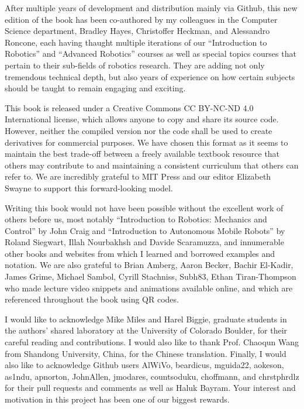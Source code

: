 \documentclass[paper=7in:9in,pagesize=pdftex,11pt,twoside,openright]{scrbook}
\begin{document}
After multiple years of development and distribution mainly via Github, this new edition of the book has been co-authored by my colleagues in the Computer Science department, Bradley Hayes, Christoffer Heckman, and Alessandro Roncone, each having thaught multiple iterations of our ``Introduction to Robotics'' and ``Advanced Robotics'' courses as well as special topics courses that pertain to their sub-fields of robotics research. They are adding not only tremendous technical depth, but also years of experience on how certain subjects should be taught to remain engaging and exciting.

This book is released under a Creative Commons CC BY-NC-ND 4.0 International license, which allows anyone to copy and share its source code. However, neither the compiled version nor the code shall be used to create derivatives for commercial purposes. We have chosen this format as it seems to maintain the best trade-off between a freely available textbook resource that others may contribute to and maintaining a consistent curriculum that others can refer to. We are incredibly grateful to MIT Press and our editor Elizabeth Swayne to support this forward-looking model.

Writing this book would not have been possible without the excellent work of others before us, most notably ``Introduction to Robotics: Mechanics and Control'' by John Craig and ``Introduction to Autonomous Mobile Robots'' by Roland Siegwart, Illah Nourbakhsh and Davide Scaramuzza, and innumerable other books and websites from which I learned and borrowed examples and notation. We are also grateful to Brian Amberg, Aaron Becker, Bachir El-Kadir,  James Grime, Michael Sambol, Cyrill Stachniss, Subh83, Ethan Tiran-Thompson who made lecture video snippets and animations available online, and which are referenced throughout the book using QR codes.

I would like to acknowledge Mike Miles and Harel Biggie, graduate students in the authors' shared laboratory at the University of Colorado Boulder, for their careful reading and contributions. I would also like to thank Prof. Chaoqun Wang from Shandong University, China, for the Chinese translation.  Finally, I would also like to acknowledge Github users AlWiVo, beardicus, mguida22, aokeson, as1ndu, apnorton, JohnAllen, jmodares, countsoduku, choffmann, and chrstphrdlz for their pull requests and comments as well as Haluk Bayram. Your interest and motivation in this project has been one of our biggest rewards.
\end{document}
